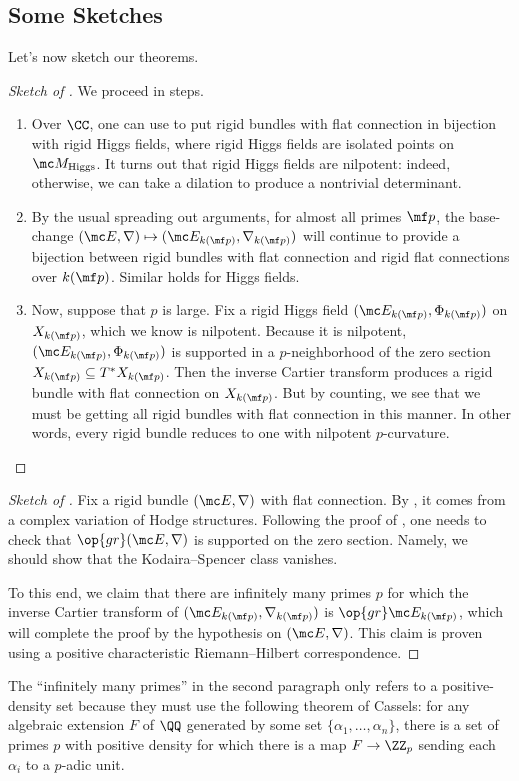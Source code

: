 \documentclass[../notes.tex]{subfiles}
\begin{document}
\subsection{Some Sketches}
Let's now sketch our theorems.
\begin{proof}[Sketch of ]
	We proceed in steps.
	\begin{enumerate}
		\item Over $\CC$, one can use  to put rigid bundles with flat connection in bijection with rigid Higgs fields, where rigid Higgs fields are isolated points on $\mc M_{\mathrm{Higgs}}$. It turns out that rigid Higgs fields are nilpotent: indeed, otherwise, we can take a dilation to produce a nontrivial determinant.
		\item By the usual spreading out arguments, for almost all primes $\mf p$, the base-change $(\mc E,\nabla)\mapsto(\mc E_{k(\mf p)},\nabla_{k(\mf p)})$ will continue to provide a bijection between rigid bundles with flat connection and rigid flat connections over $k(\mf p)$. Similar holds for Higgs fields.
		\item Now, suppose that $p$ is large. Fix a rigid Higgs field $(\mc E_{k(\mf p)},\Phi_{k(\mf p)})$ on $X_{k(\mf p)}$, which we know is nilpotent. Because it is nilpotent, $(\mc E_{k(\mf p)},\Phi_{k(\mf p)})$ is supported in a $p$-neighborhood of the zero section $X_{k(\mf p)}\subseteq T^*X_{k(\mf p)}$. Then the inverse Cartier transform produces a rigid bundle with flat connection on $X_{k(\mf p)}$. But by counting, we see that we must be getting all rigid bundles with flat connection in this manner. In other words, every rigid bundle reduces to one with nilpotent $p$-curvature.
		\qedhere
	\end{enumerate}
\end{proof}
\begin{proof}[Sketch of ]
	Fix a rigid bundle $(\mc E,\nabla)$ with flat connection. By , it comes from a complex variation of Hodge structures. Following the proof of , one needs to check that $\op{gr}(\mc E,\nabla)$ is supported on the zero section. Namely, we should show that the Kodaira--Spencer class vanishes.
	
	To this end, we claim that there are infinitely many primes $p$ for which the inverse Cartier transform of $(\mc E_{k(\mf p)},\nabla_{k(\mf p)})$ is $\op{gr}\mc E_{k(\mf p)}$, which will complete the proof by the hypothesis on $(\mc E,\nabla)$. This claim is proven using a positive characteristic Riemann--Hilbert correspondence.
\end{proof}
\begin{remark}
	The ``infinitely many primes'' in the second paragraph only refers to a positive-density set because they must use the following theorem of Cassels: for any algebraic extension $F$ of $\QQ$ generated by some set $\{\alpha_1,\ldots,\alpha_n\}$, there is a set of primes $p$ with positive density for which there is a map $F\to\ZZ_p$ sending each $\alpha_i$ to a $p$-adic unit.
\end{remark}
\end{document}

